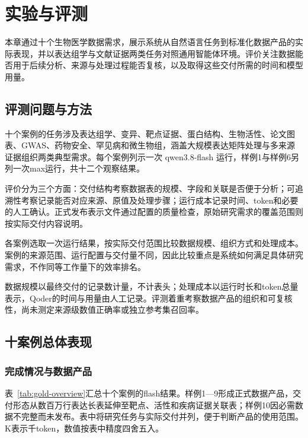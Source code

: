 \chapter{实验与评测}\label{ch:experiments}

本章通过十个生物医学数据需求，展示系统从自然语言任务到标准化数据产品的实际表现，并以表达组学与文献证据两类任务对照通用智能体环境。评价关注数据能否用于后续分析、来源与处理过程能否复核，以及取得这些交付所需的时间和模型用量。

\section{评测问题与方法}\label{sec:eval-protocol}

十个案例的任务涉及表达组学、变异、靶点证据、蛋白结构、生物活性、论文图表、GWAS、药物安全、罕见病和微生物组，涵盖大规模表达矩阵处理与多来源证据组织两类典型需求。每个案例列示一次 \mbox{qwen3.8-flash} 运行，样例1与样例6另列一次max运行，共十二个观察结果。

评价分为三个方面：交付结构考察数据表的规模、字段和关联是否便于分析；可追溯性考察记录能否对应来源、原值及处理步骤；运行成本记录时间、token和必要的人工确认。正式发布表示文件通过配置的质量检查，原始研究需求的覆盖范围则按实际交付内容说明。

各案例选取一次运行结果，按实际交付范围比较数据规模、组织方式和处理成本。案例的来源范围、运行配置与交付量不同，因此比较重点是系统如何满足具体研究需求，不作同等工作量下的效率排名。

数据规模以最终交付的记录数计量，不计表头；处理成本以运行时长和token总量表示，Qoder的时间与用量由人工记录。评测着重考察数据产品的组织和可复核性，尚未测定来源级数值正确率或独立参考集召回率。

\section{十案例总体表现}\label{sec:gold-overview}

\subsection{完成情况与数据产品}

表~\ref{tab:gold-overview}汇总十个案例的flash结果。样例1—9形成正式数据产品，交付形态从数百万行表达长表延伸至靶点、活性和疾病证据关联表；样例10因必需数据不完整而未发布。表中将研究任务与实际交付并列，便于判断产品的使用范围。K表示千token，数值按表中精度四舍五入。

